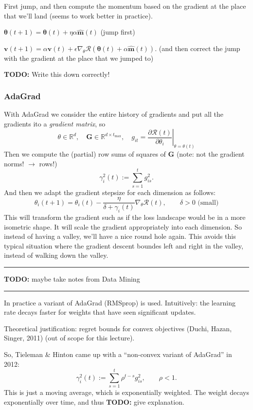 \documentclass[a2paper,8pt]{extarticle}
\newcommand{\R}{\mathbb{R}}
\newcommand{\cR}{\mathcal{R}}
\newcommand{\mat}[1]{\mathbf{#1}}
\renewcommand{\vec}[1]{\mathbf{#1}}
\newcommand{\vv}{\vec{v}}
\newcommand{\vhm}{\widehat{\vec{m}}}
\newcommand{\vtheta}{\boldsymbol{\theta}}
\newcommand{\MG}{\mat{G}}
\newcommand{\evalat}[2]{\left. #1 \right|_{#2}}
\newcommand{\todo}[1]{\textbf{TODO:} #1}
\newcommand{\todo}[1]{%
}
\newcommand{\sep}{\vspace{0pt}\noindent\hrule\vspace{0pt}}
\newcommand{\sep}{\vspace{5pt}\noindent\hrule\vspace{5pt}}
\begin{document}
\begin{landscape}
\begin{multicols*}{7}
First jump, and then compute the momentum based on the gradient at the place
that we'll land (seems to work better in practice).

$
\vtheta(t+1)=\vtheta(t)+\eta\alpha\vhm(t)
$ (jump first)

$
\vv(t+1)=\alpha \vv(t) +
\epsilon\nabla_\theta\cR(\vtheta(t)+\alpha\vhm(t)).
$ (and then correct the jump with the gradient at the place that we jumped to)

\todo{Write this down correctly!}

\subsubsection{AdaGrad}

With AdaGrad we consider the entire history of gradients and put all the
gradients ito a \emph{gradient matrix}, so
\[
\theta\in\R^d,
\quad
\MG\in\R^{d\times t_{\max}},
\quad
g_{it}
=
\evalat{\frac{\partial \cR(t)}{\partial \theta_i}}{\theta=\theta(t)}
\]
Then we compute the (partial) row sums of squares of $\MG$ (note: not the
gradient norms! $\to$ rows!)
\[
\gamma_i^2(t):=\sum_{s=1}^tg_{is}^2.
\]
And then we adapt the gradient stepsize for each dimension as follows:
\[
\theta_i(t+1)=\theta_i(t)-\frac{\eta}{\delta+\gamma_i(t)}\nabla_\theta\cR(t),
\qquad
\delta>0\text{ (small)}
\]
This will transform the gradient such as if the loss landscape would be in a
more isometric shape. It will scale the gradient appropriately into each
dimension. So instead of having a valley, we'll have a nice round hole again.
This avoids this typical situation where the gradient descent boundes left and
right in the valley, instead of walking down the valley.

\sep

\todo{maybe take notes from Data Mining}

\sep

In practice a variant of AdaGrad (RMSprop) is used. Intuitively: the learning
rate decays faster for weights that have seen significant updates.

Theoretical justification: regret bounds for convex objectives (Duchi, Hazan,
Singer, 2011) (out of scope for this lecture).

So, Tieleman \& Hinton came up with a ``non-convex variant of AdaGrad'' in 2012:
\[
\gamma_i^2(t):=\sum_{s=1}^t\rho^{t-s}g_{is}^2,
\qquad
\rho<1.
\]
This is just a moving average, which is exponentially weighted. The weight
decays exponentially over time, and thus \todo{give explanation}.


\end{multicols*}
\end{landscape}
\end{document}
